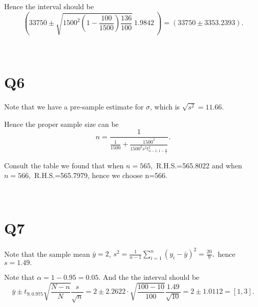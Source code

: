 \documentclass[12pt]{article}%
\begin{document}
Hence the interval should be $$(33750\pm \sqrt{1500^2(1-\frac{100}{1500})\frac{136}{100}}~1.9842~)=(33750\pm 3353.2393).$$

~ \ 

\section{Q6}

Note that we have a pre-sample estimate for $\sigma$, which is $\sqrt{s^2}=11.66.$

Hence the proper sample size can be $$n=\frac{1}{\frac{1}{1500}+\frac{1500^2}{1500^2s^2t_{n-1,1-\frac{\alpha}{2}}^2}}.$$

Consult the table we found that when $n=565,$ R.H.S.=565.8022 and when $n=566,$ R.H.S.=565.7979, hence we choose n=566.



~\ 

\section{Q7}

Note that the sample mean $\bar{y}=2$, $s^2=\frac{1}{n-1}\sum_{i=1}^{n}(y_i-\bar{y})^2=\frac{20}{9},$ hence $s=1.49.$

Note that $\alpha=1-0.95=0.05.$ And the the interval should be $$\bar{y}\pm t_{9,0.975}\sqrt{\frac{N-n}{N}}\frac{s}{\sqrt{n}}=2\pm 2.2622\cdot \sqrt{\frac{100-10}{100}}\frac{1.49}{\sqrt{10}}=2\pm 1.0112=[1,3].$$
\end{document}

